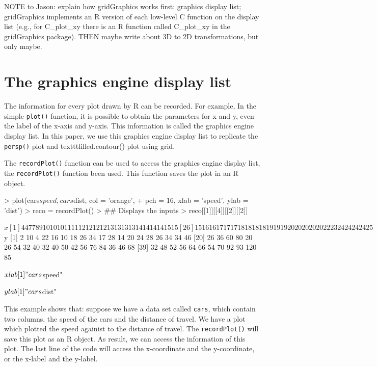 \documentclass[a4paper,10pt]{article}
\begin{document}
NOTE to Jason: explain how gridGraphics works first: graphics display list; gridGraphics implements an R version of each low-level C function on the display list (e.g., for C\_plot\_xy there is an R function called C\_plot\_xy in the gridGraphics package). THEN maybe write about 3D to 2D transformations, but only maybe.


\section{The graphics engine display list}
The information for every plot drawn by R can be recorded. For example, In the simple \texttt{plot()} function, it is possible to obtain the parameters for x and y, even the label of the x-axis and y-axis.
This information is called the graphics engine display list. In this paper, we use this graphics engine display list to replicate the \texttt{persp()} plot and texttt{filled.contour()} plot using grid.

The \texttt{recordPlot()} function can be used to access the graphics engine display list, the \texttt{recordPlot()} function been used. This function saves the plot in an R object. 


\begin{Schunk}
\begin{Sinput}
> plot(cars$speed, cars$dist, col = 'orange', 
+       pch = 16, xlab = 'speed', ylab = 'dist')
> reco = recordPlot()
> ## Displays the inputs 
> reco[[1]][[4]][[2]][[2]]
\end{Sinput}
\begin{Soutput}
$x
 [1]  4  4  7  7  8  9 10 10 10 11 11 12 12 12 12 13 13 13 13 14 14 14 14 15 15
[26] 15 16 16 17 17 17 18 18 18 18 19 19 19 20 20 20 20 20 22 23 24 24 24 24 25

$y
 [1]   2  10   4  22  16  10  18  26  34  17  28  14  20  24  28  26  34  34  46
[20]  26  36  60  80  20  26  54  32  40  32  40  50  42  56  76  84  36  46  68
[39]  32  48  52  56  64  66  54  70  92  93 120  85

$xlab
[1] "cars$speed"

$ylab
[1] "cars$dist"
\end{Soutput}
\end{Schunk}


This example shows that: suppose we have a data set called \texttt{cars}, which contain two columns, the speed of the cars and the distance of travel. We have a plot which plotted the speed againist to the distance of travel. The \texttt{recordPlot()} will save this plot as an R object. As result, we can access the information of this plot. The last line of the code will access the x-coordinate and the y-coordinate, or the x-label and the y-label. \\
\end{document}
